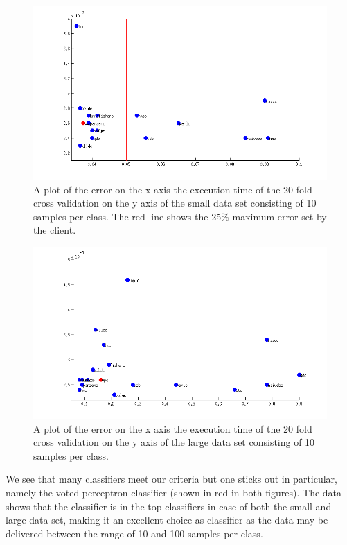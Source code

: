 \documentclass[%
        compressed,
        final,
        notitlepage,
        narroweqnarray,
        inline,
        twoside,
        ]{ieee}
\begin{document}
\begin{figure}
    \includegraphics[width=\columnwidth]{images/large_data_set_all_classifiers_tested3.png}
    \caption{A plot of the error on the x axis the execution time of the 20 fold
    cross validation on the y axis of the small data set consisting of 10
    samples per class. The red line shows the 25\% maximum error set by the client.}
    \label{fig:test-large}
\end{figure}
    
\begin{figure}
    \includegraphics[width=\columnwidth]{images/small_data_set_all_classifiers_tested3.png}
    \caption{A plot of the error on the x axis the execution time of the 20 fold
    cross validation on the y axis of the large data set consisting of 10
samples per class. }
    \label{fig:test-small}
\end{figure}

We see that many classifiers meet our criteria but one sticks out in particular, namely the voted perceptron classifier (shown in red in both figures). The data shows that the classifier is in the top classifiers in case of both the small and large data set, making it an excellent choice as classifier as the data may be delivered between the range of 10 and 100 samples per class.
\end{document}
